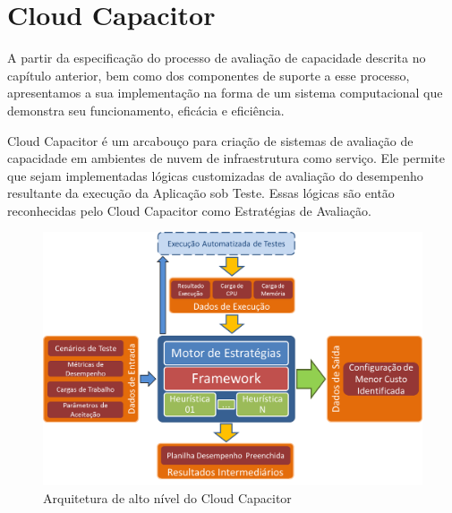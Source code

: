 \chapter[Cloud Capacitor]{Cloud Capacitor}
A partir da especificação do processo de avaliação de capacidade descrita no
capítulo anterior, bem como dos componentes de suporte a esse processo, apresentamos
a sua implementação na forma de um sistema computacional que demonstra seu funcionamento,
eficácia e eficiência.

Cloud Capacitor é um arcabouço para criação de sistemas de avaliação de 
capacidade em ambientes de nuvem de infraestrutura como serviço. Ele permite que 
sejam implementadas lógicas customizadas de avaliação do desempenho resultante
da execução da Aplicação sob Teste. Essas lógicas são então reconhecidas pelo Cloud 
Capacitor como Estratégias de Avaliação.

\begin{figure}[htb]
  \caption{\label{fig_arq_alto_nivel}Arquitetura de alto nível do Cloud Capacitor}
  \begin{center}
    \includegraphics[scale=0.5]{img/arquiteturaAltoNivel}
  \end{center}
\end{figure}
 
